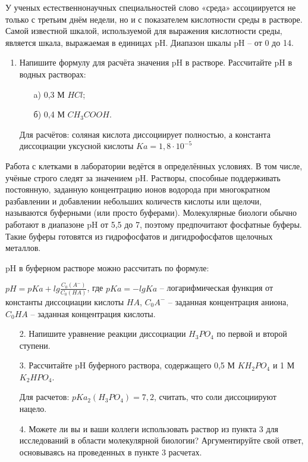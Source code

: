 
У ученых естественнонаучных специальностей слово «среда» ассоциируется не только с третьим днём недели, 
но и с показателем кислотности среды в растворе. Самой известной шкалой, используемой для выражения 
кислотности среды, является шкала, выражаемая в единицах pH. Диапазон шкалы pH – от 0 до 14.

\begin{enumerate}
    \item Напишите формулу для расчёта значения pH в растворе. Рассчитайте pH в водных растворах:
    \begin{enumerate}
        \item[a)] 0,3 М $HCl$;
        \item[б)] 0,4 М $CH_3COOH$.
    \end{enumerate}
        
    Для расчётов: соляная кислота диссоциирует полностью, а константа диссоциации уксусной кислоты $Ka = 1,8 \cdot 10^{-5}$
\end{enumerate}

Работа с клетками в лаборатории ведётся в определённых условиях. В том числе, учёные строго следят за значением 
pH. Растворы, способные поддерживать постоянную, заданную концентрацию ионов водорода при многократном разбавлении 
и добавлении небольших количеств кислоты или щелочи, называются буферными (или просто буферами). Молекулярные 
биологи обычно работают в диапазоне pH от 5,5 до 7, поэтому предпочитают фосфатные буферы. Такие буферы готовятся 
из гидрофосфатов и дигидрофосфатов щелочных металлов.

pH в буферном растворе можно рассчитать по формуле:

$pH = pKa + lg \frac{C_0 (A^-)}{C_0 (HA)}$, где $pKa = -lgKa$ – логарифмическая функция от константы диссоциации кислоты $HA$, 
$C_0A^-$ – заданная концентрация аниона, $C_0HA$ – заданная концентрация кислоты.

\begin{enumerate}
    \item[2.] Напишите уравнение реакции диссоциации $H_3PO_4$ по первой и второй ступени.
    \item[3.] Рассчитайте pH буферного раствора, содержащего 0,5 М $KH_2PO_4$ и 1 М $K_2HPO_4$.
    
    Для расчетов: $pKa_2 (H_3PO_4) = 7,2$, считать, что соли диссоциируют нацело.

    \item[4.] Можете ли вы и ваши коллеги использовать раствор из пункта 3 для исследований в области молекулярной биологии? Аргументируйте свой ответ, основываясь на проведенных в пункте 3 расчетах.
\end{enumerate}

